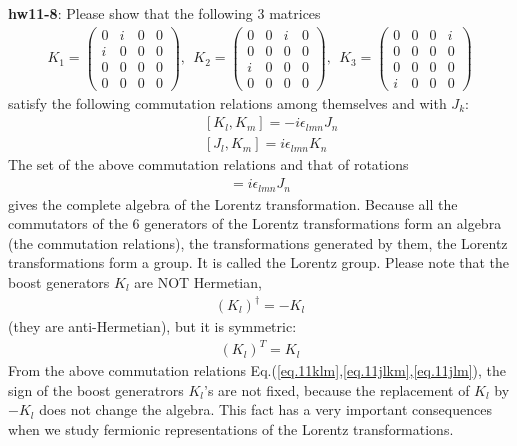 \documentclass[12pt]{article}
\begin{document}
{\bf hw11-8}: Please show that the following $3$ matrices
\begin{eqnarray}
  K_1 =
  \begin{pmatrix}
     0 & i & 0 & 0\\ 
     i & 0 & 0 & 0 \\
     0 & 0 & 0 & 0 \\
     0 & 0 & 0 & 0 
  \end{pmatrix}
  ,~~K_2 =
  \begin{pmatrix}
    0 & 0 & i & 0\\ 
    0 & 0 & 0 & 0 \\
    i & 0 & 0 & 0 \\
    0 & 0 & 0 & 0
  \end{pmatrix}
   ,~~K_3=
   \begin{pmatrix}
    0 & 0 & 0 & i \\
    0 & 0 & 0 & 0 \\
    0 & 0 & 0 & 0 \\
    i & 0 & 0 & 0 
   \end{pmatrix} \label{eq.11k123matx}
\end{eqnarray}
  satisfy the following commutation relations among themselves and
  with $J_k$:
\begin{eqnarray}
  &&[ K_l, K_m ] = -i\epsilon_{lmn} J_n \label{eq.11klm}\\
  &&[ J_l, K_m ] =  i\epsilon_{lmn} K_n \label{eq.11jlkm}
\end{eqnarray}
  The set of the above commutation relations and that of rotations
\begin{eqnarray}
  [ J_l, J_m ] =  i\epsilon_{lmn} J_n \label{eq.11jlm}
\end{eqnarray}
  gives the complete algebra of the Lorentz transformation.  Because
  all the commutators of the 6 generators of the Lorentz transformations
  form an algebra (the commutation relations), the transformations
  generated by them, the Lorentz transformations form a group. It is
  called the Lorentz group.
  Please note that the boost generators $K_l$ are NOT Hermetian,
\begin{eqnarray}
  (K_l)^\dagger = -K_l
\end{eqnarray}
  (they are anti-Hermetian), but it is symmetric:
\begin{eqnarray}
  (K_l)^T =  K_l
\end{eqnarray}
  From the above commutation relations Eq.(\ref{eq.11klm},\ref{eq.11jlkm},\ref{eq.11jlm}), the sign of the boost
  generatrors $K_l$'s are not fixed, because the replacement of $K_l$ by
  $-K_l$ does not change the algebra. This fact has a very important
  consequences when we study fermionic representations of the Lorentz
  transformations.
\end{document}
